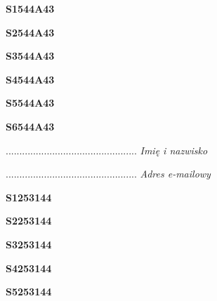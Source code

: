 \begin{turn}{90}\huge \textbf{S1544A43}\end{turn}

\begin{turn}{90}\huge \textbf{S2544A43}\end{turn}

\begin{turn}{90}\huge \textbf{S3544A43}\end{turn}

\begin{turn}{90}\huge \textbf{S4544A43}\end{turn}

\begin{turn}{90}\huge \textbf{S5544A43}\end{turn}

\begin{turn}{90}\huge \textbf{S6544A43}\end{turn}

\begin{turn}{90}\begin{minipage}{\linewidth} \vspace{20mm} ................................................  \textit{Imię i nazwisko}\end{minipage}\end{turn}

\begin{turn}{90}\begin{minipage}{\linewidth} \vspace{20mm} ................................................  \textit{Adres e-mailowy}\end{minipage}\end{turn}

\begin{turn}{90}\huge \textbf{S1253144}\end{turn}

\begin{turn}{90}\huge \textbf{S2253144}\end{turn}

\begin{turn}{90}\huge \textbf{S3253144}\end{turn}

\begin{turn}{90}\huge \textbf{S4253144}\end{turn}

\begin{turn}{90}\huge \textbf{S5253144}\end{turn}

